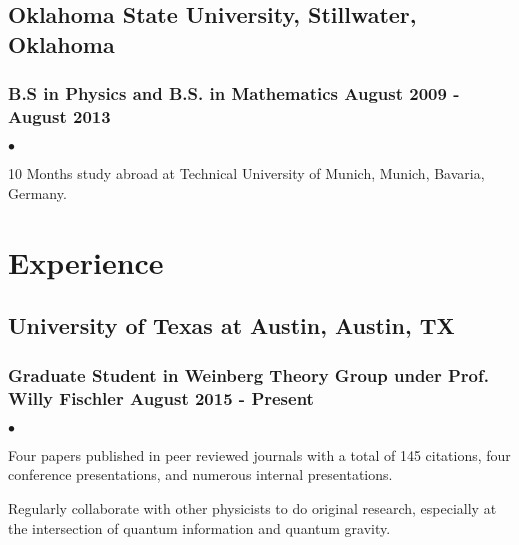 \documentclass[letterpaper]{article}
\renewenvironment{itemize}{
  \begin{list}{$\bullet$}{
    \setlength{\itemsep}{0em}
    \setlength{\parskip}{0em}
    \setlength{\parsep}{0em} 
    \setlength{\topsep}{0em} 
  }
}{
  \end{list}
}
\begin{document}
\subsection*{Oklahoma State University, Stillwater, Oklahoma}
\subsubsection*{B.S in Physics and B.S. in Mathematics \hfill August 2009 - August 2013}

\begin{itemize}
\item 10 Months study abroad at Technical University of Munich, Munich, Bavaria, Germany.
\end{itemize}

\section*{Experience}

\subsection*{University of Texas at Austin, Austin, TX} 
\subsubsection*{Graduate Student in Weinberg Theory Group under Prof. Willy Fischler \hfill August 2015 - Present}
    \begin{itemize}
    
        \item Four papers published in peer reviewed journals with a total of 145 citations, four conference presentations, and numerous internal presentations.
        \item Regularly collaborate with other physicists to do original research, especially at the intersection of quantum information and quantum gravity.
        
    \end{itemize}
    
\end{document}

